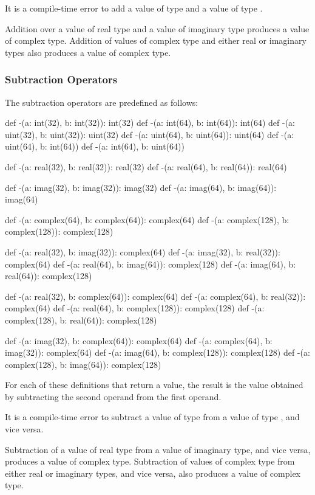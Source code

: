 It is a compile-time error to add a value of type  and
a value of type .

Addition over a value of real type and a value of imaginary type
produces a value of complex type.  Addition of values of complex type
and either real or imaginary types also produces a value of complex
type.

\subsubsection{Subtraction Operators}
\label{Subtraction_Operators}

The subtraction operators are predefined as follows:
\begin{chapel}
def -(a: int(32), b: int(32)): int(32)
def -(a: int(64), b: int(64)): int(64)
def -(a: uint(32), b: uint(32)): uint(32)
def -(a: uint(64), b: uint(64)): uint(64)
def -(a: uint(64), b: int(64))
def -(a: int(64), b: uint(64))

def -(a: real(32), b: real(32)): real(32)
def -(a: real(64), b: real(64)): real(64)

def -(a: imag(32), b: imag(32)): imag(32)
def -(a: imag(64), b: imag(64)): imag(64)

def -(a: complex(64), b: complex(64)): complex(64)
def -(a: complex(128), b: complex(128)): complex(128)

def -(a: real(32), b: imag(32)): complex(64)
def -(a: imag(32), b: real(32)): complex(64)
def -(a: real(64), b: imag(64)): complex(128)
def -(a: imag(64), b: real(64)): complex(128)

def -(a: real(32), b: complex(64)): complex(64)
def -(a: complex(64), b: real(32)): complex(64)
def -(a: real(64), b: complex(128)): complex(128)
def -(a: complex(128), b: real(64)): complex(128)

def -(a: imag(32), b: complex(64)): complex(64)
def -(a: complex(64), b: imag(32)): complex(64)
def -(a: imag(64), b: complex(128)): complex(128)
def -(a: complex(128), b: imag(64)): complex(128)
\end{chapel}
For each of these definitions that return a value, the result is the
value obtained by subtracting the second operand from the first
operand.

It is a compile-time error to subtract a value of type 
from a value of type , and vice versa.

Subtraction of a value of real type from a value of imaginary type,
and vice versa, produces a value of complex type.  Subtraction of
values of complex type from either real or imaginary types, and vice
versa, also produces a value of complex type.

